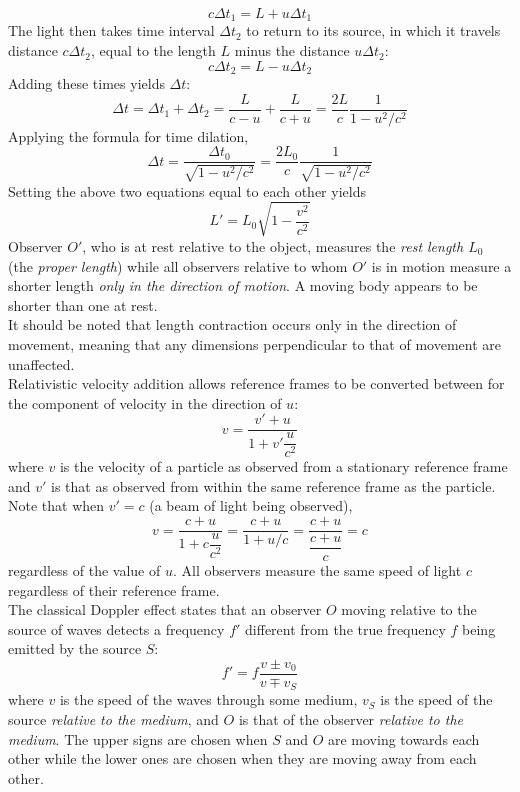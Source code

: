 \documentclass{subfiles}
\begin{document}
				\[c\Delta t_1 = L + u\Delta t_1\]
				The light then takes time interval \(\Delta t_2\) to return to its source, in which it travels distance \(c\Delta t_2\), equal to the length \(L\) minus the distance \(u\Delta t_2\):
				\[c\Delta t_2 = L - u\Delta t_2\]
				Adding these times yields \(\Delta t\):
				\[
					\Delta t = \Delta t_1 + \Delta t_2
						= \frac{L}{c - u} + \frac{L}{c + u}
						= \frac{2L}{c}\frac{1}{1 - u^2/c^2}
				\]
				Applying the formula for time dilation,
				\[
					\Delta t = \frac{\Delta t_0}{\sqrt{1 - u^2/c^2}}
						= \frac{2L_0}{c}\frac{1}{\sqrt{1 - u^2/c^2}}
				\]
				Setting the above two equations equal to each other yields
				\[L' = L_0\sqrt{1 - \frac{v^2}{c^2}} \tag{length contraction}\]
				Observer \(O'\), who is at rest relative to the object, measures the \textit{rest length \(L_0\)} (the \textit{proper length}) while all observers relative to whom \(O'\) is in motion measure a shorter length \textit{only in the direction of motion}.
				A moving body appears to be shorter than one at rest. \\
				It should be noted that length contraction occurs only in the direction of movement, meaning that any dimensions perpendicular to that of movement are unaffected. \\
			Relativistic velocity addition allows reference frames to be converted between for the component of velocity in the direction of \(u\):
				\[v = \frac{v' + u}{1 + v'\dfrac{u}{c^2}} \tag{relativistic velocity addition}\]
				where \(v\) is the velocity of a particle as observed from a stationary reference frame and \(v'\) is that as observed from within the same reference frame as the particle. Note that when \(v' = c\) (a beam of light being observed),
				\[
					v = \frac{c + u}{1 + c\dfrac{u}{c^2}}
							= \frac{c + u}{1 + u/c}
							= \frac{c + u}{\dfrac{c + u}{c}}
							= c
				\]
				regardless of the value of \(u\). All observers measure the same speed of light \(c\) regardless of their reference frame. \\
			The classical Doppler effect states that an observer \(O\) moving relative to the source of waves detects a frequency \(f'\) different from the true frequency \(f\) being emitted by the source \(S\):
				\[f' = f\frac{v \pm v_0}{v \mp v_S} \tag{classical Doppler effect}\]
				where \(v\) is the speed of the waves through some medium, \(v_S\) is the speed of the source \textit{relative to the medium}, and \(O\) is that of the observer \textit{relative to the medium}. The upper signs are chosen when \(S\) and \(O\) are moving towards each other while the lower ones are chosen when they are moving away from each other. \\
\end{document}
